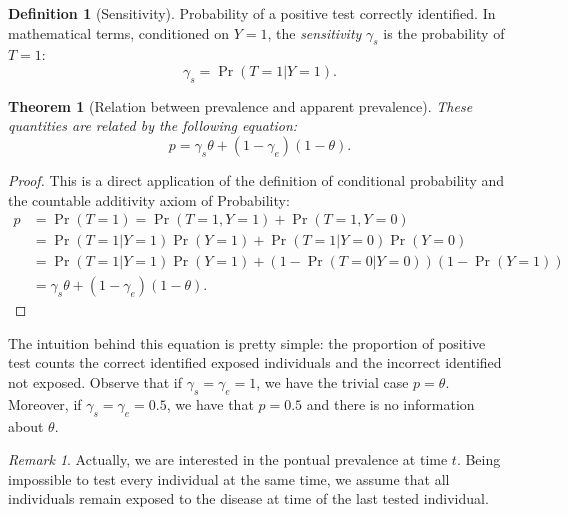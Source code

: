 \documentclass[a4paper, notitlepage, 11pt]{article}
\newtheorem{theorem}{Theorem}[]
\theoremstyle{definition}
\newtheorem{definition}{Definition}[section]
\theoremstyle{remark}
\newtheorem*{remark}{Remark}
\begin{document}
\begin{definition}[Sensitivity]
  Probability of a positive test correctly identified. In mathematical terms,
  conditioned on $Y = 1$, the {\em sensitivity} $\gamma_s$ is the probability of $T = 1$: 
  \begin{equation}
    \gamma_s = \Pr(T = 1|Y = 1). 
  \end{equation} 
\end{definition}

\begin{theorem}[Relation between prevalence and apparent prevalence] These quantities are related by the following equation:
  \begin{equation}
    p = \gamma_s\theta + (1-\gamma_e)(1-\theta).
  \end{equation}
  
\end{theorem}

\begin{proof}
  This is a direct application of the definition of conditional probability
  and the countable additivity axiom of Probability:
  \begin{equation*}
    \begin{split}
      p &= \Pr(T = 1) = \Pr(T = 1, Y = 1) + \Pr(T = 1, Y = 0) \\
      &= \Pr(T=1|Y=1)\Pr(Y=1) + \Pr(T=1|Y=0)\Pr(Y=0) \\
      &= \Pr(T=1|Y=1)\Pr(Y=1) + (1 - \Pr(T=0|Y=0))(1-\Pr(Y=1)) \\
      &= \gamma_s\theta + (1 - \gamma_e)(1-\theta).
    \end{split}
  \end{equation*} 
\end{proof}

The intuition behind this equation is pretty simple: the proportion
of positive test counts the correct identified exposed individuals and the
incorrect identified not exposed. Observe that if $\gamma_s = \gamma_e = 1$, we have the trivial case $p =
\theta$. Moreover, if $\gamma_s = \gamma_e = 0.5$, we have that
$p = 0.5$ and there is no information about $\theta$. 

\begin{remark}
  Actually, we are interested in the pontual prevalence at time $t$. Being
  impossible to test every individual at the same time, we assume that all
  individuals remain exposed to the disease at time of the last tested individual. 
\end{remark}
\end{document}
